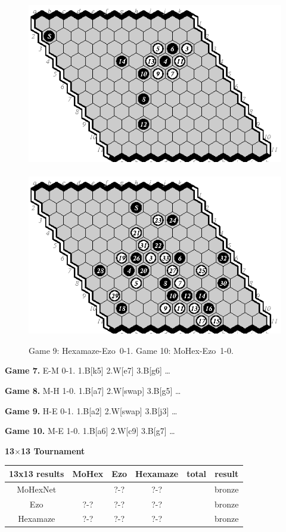 \documentclass{icga}
\def\Eo{\mbox{\sc Ezo}}
\def\Hz{\mbox{\sc Hexamaze}}
\def\Mx{\mbox{\sc MoHex}}
\def\Mt{\mbox{\sc MoHexNet}}
\begin{document}
\begin{figure}[hbp]
\includegraphics[scale=1.3]{games/pix/09-he-0-1.eps}\hspace*{-1cm}\
\includegraphics[scale=1.3]{games/pix/10-me-1-0.eps}
\caption{Game 9: \Hz-\Eo\ 0-1. Game 10: \Mx-\Eo\ 1-0.}
\end{figure}

{\bf Game 7.}
{\sc E-M 0-1.}
1.B[k5] 2.W[e7] 3.B[g6] \ldots ~ ~ 

{\bf Game 8.}
{\sc M-H 1-0.}
1.B[a7] 2.W[swap] 3.B[g5] \ldots ~ ~ 

{\bf Game 9.}
{\sc H-E 0-1.}
1.B[a2] 2.W[swap] 3.B[j3] \ldots ~ ~ 

{\bf Game 10.}
{\sc M-E 1-0.}
1.B[a6] 2.W[c9] 3.B[g7] \ldots ~ ~ 

\newpage
{\large\bf 13$\times$13 Tournament}

\hfill\begin{tabular}{|c|c|c|c|c|c|}
\hline 13x13 results &\Mx{} &\Eo{}  &\Hz{}   & total & result \\ 
\hline \Mt{}         &      &  ?-?    & ?-?  & & bronze \\
\hline \Eo{}         &  ?-? &  ?-?    & ?-?  & & bronze \\
\hline \Hz{}         &  ?-? &  ?-?    & ?-?  & & bronze \\
\hline
\end{tabular}\hfill~
\end{document}
